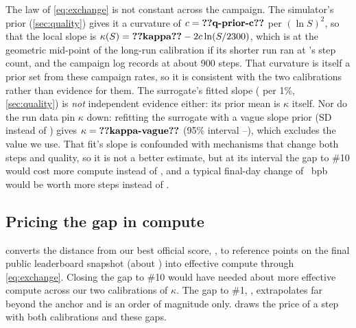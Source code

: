 The law of \cref{eq:exchange} is not constant across the campaign. The simulator's prior
(\cref{sec:quality}) gives it a curvature of $c=\val{q-prior-c}$ per $(\ln S)^2$, so that the local slope is
$\kappa(S)=\val{kappa}-2c\ln(S/2300)$, which is  at the geometric mid-point of the long-run calibration if its shorter run ran at
's step count, and the campaign log records \docnum{} at about 900 steps. That curvature is
itself a prior set from these campaign rates, so it is consistent with the two calibrations rather than evidence for
them. The surrogate's fitted slope ( per 1\%, \cref{sec:quality}) is \emph{not} independent
evidence either: its prior mean is $\kappa$ itself. Nor do the run data pin $\kappa$ down: refitting the surrogate with
a vague slope prior (SD  instead of ) gives $\kappa=\val{kappa-vague}$
(95\% interval --), which excludes the value we use. That fit's slope is
confounded with mechanisms that change both steps and quality, so it is not a better estimate, but at its interval
the gap to \#10 would cost  more compute instead of , and a typical
final-day change of \docnum{}~bpb would be worth  more steps instead of
.

\subsection{Pricing the gap in compute}
\label{sec:gap}

 converts the distance from our best official score, , to reference points on the final
public leaderboard snapshot (about \docnum{}) into effective compute through
\cref{eq:exchange}. Closing the  gap to \#10 would have needed about  more effective
compute across our two calibrations of $\kappa$. The gap to \#1, , extrapolates far beyond the
 anchor and is an order of magnitude only.  draws the price of a step with both
calibrations and these gaps.

\begin{table}[!htbp]
  \centering
  \caption{\textbf{What each leaderboard reference would cost in effective compute}, from our best official score
    (, ), as $\exp(\text{gap}/\kappa)-1$ for the price used ($\kappa=\val{kappa}$) and
    for the long-run calibration. Leaderboard values are from the final public snapshot, referred to by rank.}
  \label{tab:gap}
  
\end{table}

